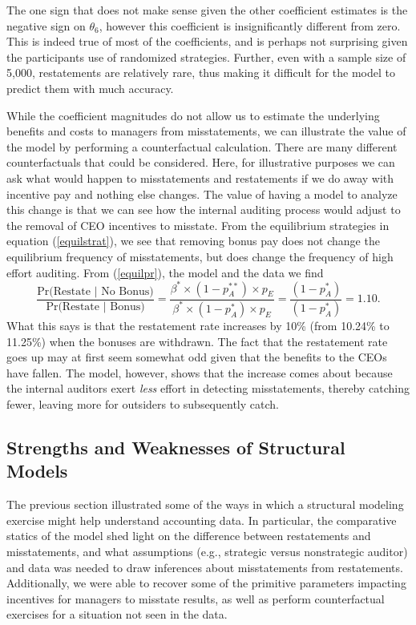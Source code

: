 The one sign that
does not make sense given the other coefficient estimates is the negative sign on $\theta_6$,
however this coefficient is insignificantly different from zero. This is indeed true of most of
the coefficients, and is perhaps not surprising given the participants use of randomized strategies.
Further, even with a sample size of 5,000, restatements are relatively rare, thus making
it difficult for the model to predict them with much accuracy. 

While
the coefficient magnitudes do not allow us to estimate the underlying benefits and costs to managers from
misstatements, we can illustrate the value of the model by performing a counterfactual calculation.
There are many different counterfactuals that could be considered. Here, for illustrative purposes
we can ask what would happen to misstatements and restatements if we 
do away with incentive pay and nothing else changes. The value of having a model to analyze this
change is that we can see how the internal auditing process would adjust to the removal of 
CEO incentives to misstate. 
From the equilibrium strategies in equation (\ref{equilstrat}), we see that removing bonus pay does not
change the equilibrium frequency of misstatements, but does change the frequency of high effort auditing.
From (\ref{equilpr}), the model and the data we find
$$ \dfrac{\mbox{Pr(Restate }\vert \mbox{ No Bonus)}}{\mbox{Pr(Restate }\vert \mbox{ Bonus)}}=\dfrac{\beta^* \times (1-p_A^{**}) \times p_{E}}
{\beta^* \times (1-p_A^{*}) \times p_{E}} = \dfrac{(1-p_A^*)}{(1-p_A^*)} = 1.10.$$
What this says is that the restatement rate increases by 10\% (from 10.24\% to 11.25\%) when the bonuses
are withdrawn. The fact that the restatement rate goes up may at first seem somewhat odd
given that the benefits to the CEOs have fallen. The model, however, shows that the increase 
comes about because the internal auditors exert {\it less} effort in detecting
misstatements, thereby catching fewer, leaving more for outsiders to subsequently catch.  

\subsection{Strengths and Weaknesses of Structural Models}

The previous section illustrated some of the ways in which a structural modeling exercise might help understand
accounting data. In particular, the comparative statics of the model shed light on the difference between restatements
and misstatements, and what assumptions (e.g., strategic versus nonstrategic auditor) and data was needed to draw 
inferences about misstatements from restatements. Additionally, we were able to recover some of the primitive parameters
impacting incentives for managers to misstate results, as well as perform counterfactual exercises for a situation not
seen in the data.

